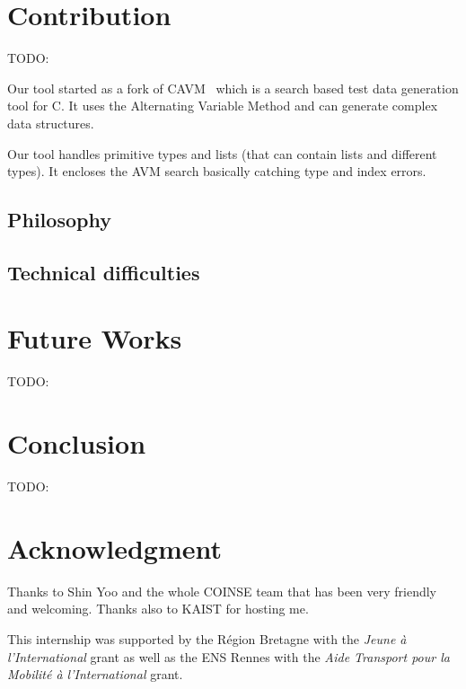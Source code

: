 \documentclass{llncs2e/llncs}
\makeatletter
\def\todo#1{{\color{red}TODO\@: #1}}
\makeatother
\begin{document}
\section{Contribution}
\label{contribution}
\todo{}

Our tool started as a fork of CAVM~\cite{Kim2017ts} which is a search based test
data generation tool for C. It uses the Alternating Variable Method and can
generate complex data structures.

Our tool handles primitive types and lists (that can contain lists and different
types). It encloses the AVM search basically catching type and index errors.


\subsection{Philosophy}
\label{philosophy}

\subsection{Technical difficulties}
\label{tech_difficulties}





\section{Future Works}
\label{futureworks}
\todo{}

\cite{gligoric2011smutant,haupt2011type,steinert2010continuous,yoo2012regression}%
\cite{chugh2012nested}%
\cite{chambers1991iterative}%

\cite{hayes1994testing}%

\cite{bottaci2010type} %


\section{Conclusion}
\label{conclusion}
\todo{}


\section*{Acknowledgment}
Thanks to Shin Yoo and the whole COINSE team that has been very friendly and
welcoming. Thanks also to KAIST for hosting me.

This internship was supported by the R\'egion Bretagne with the \textit{Jeune
\`a l'International} grant as well as the ENS Rennes with the \textit{Aide
Transport pour la Mobilit\'e \`a l'International} grant.



\end{document}
